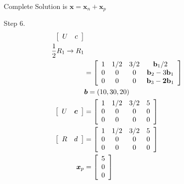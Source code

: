 \documentclass[main.tex]{subfiles}
\begin{document}
\begin{enumerate}
\begin{enumerate}
        Complete Solution is $\bm{x}=\bm{x}_{n}+\bm{x}_{p}$
        
        \item[Step 6.] 
        $$
        \begin{aligned}
        \left[\begin{array}{ll}
        U & c
        \end{array}\right]&\\
        \frac{1}{2}R_1 \rightarrow R_1\\
        &=\left[\begin{array}{cccc}
        1 & 1 / 2 & 3 / 2 & \mathbf{b}_{1} / 2 \\
        0 & 0 & 0 & \mathbf{b}_{2}-3 \mathbf{b}_{1} \\
        0 & 0 & 0 & \mathbf{b}_{3}-\mathbf{2} \mathbf{b}_{1}
        \end{array}\right]\\
        &\bm{b}=(10,30,20) \\
        \left[\begin{array}{ll}
        U & \boldsymbol{c}
        \end{array}\right]&=\left[\begin{array}{cccc}
        1 & 1 / 2 & 3 / 2 & 5 \\
        0 & 0 & 0 & 0 \\
        0 & 0 & 0 & 0
        \end{array}\right]\\
        \left[\begin{array}{ll}
        R & d
        \end{array}\right]&=\left[\begin{array}{cccc}
        1 & 1 / 2 & 3 / 2 & 5 \\
        0 & 0 & 0 & 0 \\
        0 & 0 & 0 & 0
        \end{array}\right]\\
        \bm{x}_{p} &= \left[\begin{array}{l}
        5 \\
        0 \\
        0
        \end{array}\right]
        \end{aligned}\\
        $$
        
        
    \end{enumerate}
    

\end{enumerate}
\end{document}
